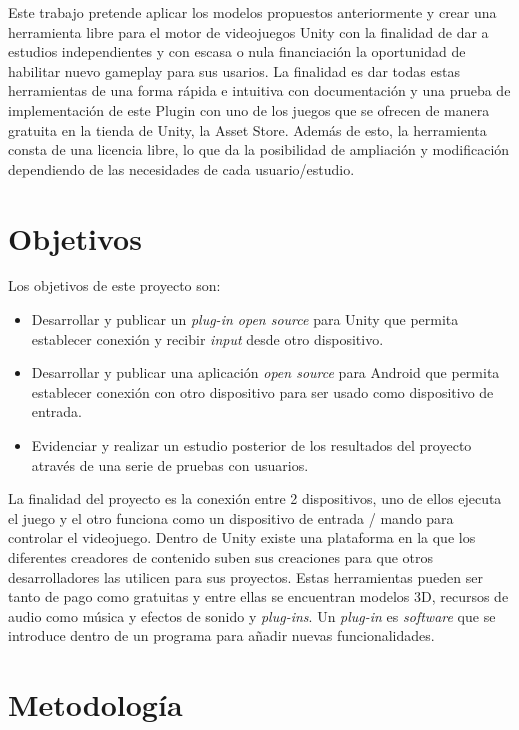 Este trabajo pretende aplicar los modelos propuestos anteriormente y crear una herramienta libre para el motor de videojuegos Unity con la finalidad de dar a estudios independientes y con escasa o nula financiaci\'on la oportunidad de habilitar nuevo gameplay para sus usarios. La finalidad es dar todas estas herramientas de una forma r\'apida e intuitiva con documentaci\'on y una prueba de implementaci\'on de este Plugin con uno de los juegos que se ofrecen de manera gratuita en la tienda de Unity, la Asset Store. Adem\'as de esto, la herramienta consta de una licencia libre, lo que da la posibilidad de ampliaci\'on y modificaci\'on dependiendo de las necesidades de cada usuario/estudio.

\section{Objetivos}

Los objetivos de este proyecto son:

\begin {itemize}
\item Desarrollar y publicar un \textit{plug-in open source} para Unity que permita establecer conexi\'on y recibir \textit{input} desde otro dispositivo.
\item Desarrollar y publicar una aplicaci\'on \textit{open source} para Android que permita establecer conexi\'on con otro dispositivo para ser usado como dispositivo de entrada.
\item Evidenciar y realizar un estudio posterior de los resultados del proyecto atrav\'es de una serie de pruebas con usuarios. 
\end {itemize}

La finalidad del proyecto es la conexi\'on entre 2 dispositivos, uno de ellos ejecuta el juego y el otro funciona como un dispositivo de entrada / mando para controlar el videojuego. 
Dentro de Unity existe una plataforma  en la que los diferentes creadores de contenido suben sus creaciones para que otros desarrolladores las utilicen para sus proyectos. Estas herramientas pueden ser tanto de pago como gratuitas y entre ellas se encuentran modelos 3D, recursos de audio como m\'usica y efectos de sonido y \textit{plug-ins}. Un \textit{plug-in} es \textit{software} que se introduce dentro de un programa para a\~nadir nuevas funcionalidades. 

\section{Metodolog\'ia}

